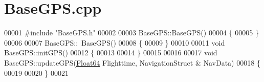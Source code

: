 \hypertarget{_base_g_p_s_8cpp_source}{}\section{Base\+G\+P\+S.\+cpp}
\label{_base_g_p_s_8cpp_source}

\begin{DoxyCode}
00001 \textcolor{preprocessor}{#include "BaseGPS.h"}
00002 
00003 BaseGPS::BaseGPS()
00004 \{
00005 \}
00006 
00007 BaseGPS::~BaseGPS()
00008 \{
00009 \}
00010 
00011 \textcolor{keywordtype}{void} BaseGPS::initGPS()
00012 \{
00013     
00014 \}
00015 
00016 
00017 \textcolor{keywordtype}{void} BaseGPS::updateGPS(\hyperlink{group___tools_ga3f1431cb9f76da10f59246d1d743dc2c}{Float64} Flighttime, NavigationStruct & NavData)
00018 \{
00019 
00020 \}
00021 
\end{DoxyCode}
